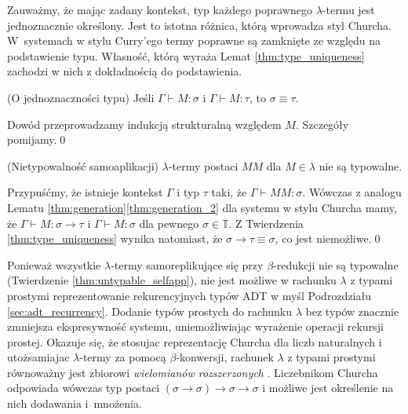 Zauważmy, że mając zadany kontekst, typ każdego poprawnego \(\lambda\)-termu jest jednoznacznie określony. Jest to istotna różnica, którą wprowadza styl Churcha. W~systemach w stylu Curry'ego termy poprawne są zamknięte ze względu na podstawienie typu. Własność, którą wyraża Lemat \ref{thm:type_uniqueness} zachodzi w nich z dokładnością do podstawienia. 

\begin{lemat}(O jednoznaczności typu)\label{thm:type_uniqueness}
  Jeśli \(\Gamma\vdash M:\sigma\) i \(\Gamma\vdash M:\tau\), to \(\sigma\equiv \tau\).
\end{lemat}
\begin{dowod}
  Dowód przeprowadzamy indukcją strukturalną względem \(M\). Szczegóły pomijamy.\qed
\end{dowod}

\begin{twierdzenie}\label{thm:untypable_selfapp}(Nietypowalność samoaplikacji)
  \(\lambda\)-termy postaci \(MM\) dla \(M\in\mathbb{\lambda}\) nie są typowalne.
\end{twierdzenie}
\begin{dowod}
  Przypuśćmy, że istnieje kontekst \(\Gamma\) i typ \(\tau\) taki, że \(\Gamma\vdash MM:\sigma\).
  Wówczas z analogu Lematu \ref{thm:generation}\ref{thm:generation_2} dla systemu w stylu Churcha mamy, że
  \(\Gamma\vdash M:\sigma\to\tau\) i \(\Gamma\vdash M:\sigma\) dla pewnego \(\sigma\in\mathbb{T}\).
  Z Twierdzenia \ref{thm:type_uniqueness} wynika natomiast, że \(\sigma\to\tau\equiv \sigma\),
  co jest niemożliwe.\qed
\end{dowod}

\begin{uwaga*}
  Ponieważ wszystkie \(\lambda\)-termy samoreplikujące się przy \(\beta\)-redukcji nie są typowalne (Twierdzenie \ref{thm:untypable_selfapp}), nie jest możliwe  w rachunku \(\lambda\) z typami prostymi reprezentowanie rekurencyjnych typów ADT w myśl Podrozdziału \ref{sec:adt_recurrency}. Dodanie typów prostych do rachunku \(\lambda\) bez typów znacznie zmniejsza ekspresywność systemu, uniemożliwiając wyrażenie operacji rekursji prostej. Okazuje się, że stosujac reprezentację Churcha dla liczb naturalnych i utożsamiajac \(\lambda\)-termy za pomocą \(\beta\)-konwersji, rachunek \(\lambda\) z typami prostymi równoważny jest zbiorowi \emph{wielomianów rozszerzonych} \cite{DBLP:journals/corr/abs-cs-0701022}. Liczebnikom Churcha odpowiada wówczas typ postaci \((\sigma\to\sigma)\to\sigma\to\sigma\) i możliwe jest określenie na nich dodawania i~mnożenia.
\end{uwaga*}

